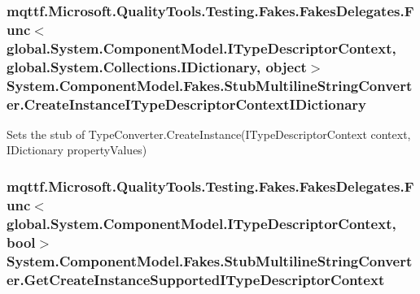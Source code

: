\hypertarget{class_system_1_1_component_model_1_1_fakes_1_1_stub_multiline_string_converter_a05660253066c01b4f6008d7a6bd816ee}{
\subsubsection[{Create\-Instance\-I\-Type\-Descriptor\-Context\-I\-Dictionary}]{\setlength{\rightskip}{0pt plus 5cm}mqttf.\-Microsoft.\-Quality\-Tools.\-Testing.\-Fakes.\-Fakes\-Delegates.\-Func$<$global.\-System.\-Component\-Model.\-I\-Type\-Descriptor\-Context, global.\-System.\-Collections.\-I\-Dictionary, object$>$ System.\-Component\-Model.\-Fakes.\-Stub\-Multiline\-String\-Converter.\-Create\-Instance\-I\-Type\-Descriptor\-Context\-I\-Dictionary}}\label{class_system_1_1_component_model_1_1_fakes_1_1_stub_multiline_string_converter_a05660253066c01b4f6008d7a6bd816ee}


Sets the stub of Type\-Converter.\-Create\-Instance(\-I\-Type\-Descriptor\-Context context, I\-Dictionary property\-Values)

\hypertarget{class_system_1_1_component_model_1_1_fakes_1_1_stub_multiline_string_converter_ae4426eae317af43ec89548451fffc80d}{
\subsubsection[{Get\-Create\-Instance\-Supported\-I\-Type\-Descriptor\-Context}]{\setlength{\rightskip}{0pt plus 5cm}mqttf.\-Microsoft.\-Quality\-Tools.\-Testing.\-Fakes.\-Fakes\-Delegates.\-Func$<$global.\-System.\-Component\-Model.\-I\-Type\-Descriptor\-Context, bool$>$ System.\-Component\-Model.\-Fakes.\-Stub\-Multiline\-String\-Converter.\-Get\-Create\-Instance\-Supported\-I\-Type\-Descriptor\-Context}}\label{class_system_1_1_component_model_1_1_fakes_1_1_stub_multiline_string_converter_ae4426eae317af43ec89548451fffc80d}


